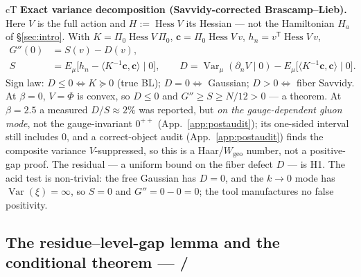 \begin{claimbox}{cT}
\smallskip
\textbf{Exact variance decomposition (Savvidy-corrected Brascamp--Lieb).} Here $V$ is the full
action and $H:=\operatorname{Hess}V$ its Hessian --- not the Hamiltonian $H_a$ of
\S\ref{sec:intro}. With
$K=\Pi_0\operatorname{Hess}V\,\Pi_0$, $\mathbf{c}=\Pi_0\operatorname{Hess}V\,v$,
$h_n=v^{\mathsf T}\operatorname{Hess}V\,v$,
\begin{equation}
\begin{aligned}
G''(0)&=S(v)-D(v),\\
S&=E_\mu\bigl[h_n-\langle K^{-1}\mathbf{c},\mathbf{c}\rangle\mid0\bigr],\qquad
D=\operatorname{Var}_\mu(\partial_nV\mid0)-E_\mu\bigl[\langle K^{-1}\mathbf{c},\mathbf{c}\rangle\mid0\bigr].
\end{aligned}
\label{eq:vardecomp}
\end{equation}
Sign law: $D\le0\iff K\succeq0$ (true BL); $D=0\iff$ Gaussian; $D>0\iff$ fiber Savvidy. At
$\beta=0$, $V=\Phi$ is convex, so $D\le0$ and $G''\ge S\ge N/12>0$ --- a theorem.
\LE{} At $\beta=2.5$ a measured $D/S\approx2\%$ was reported, but \emph{on the gauge-dependent
gluon mode}, not the gauge-invariant $0^{++}$ (App.~\ref{app:postaudit}); its one-sided interval
still includes $0$, and a correct-object audit (App.~\ref{app:postaudit}) finds the composite
variance $V$-suppressed, so this is a Haar/$W_{\mathrm{geo}}$ number, not a positive-gap proof.
The residual --- a uniform bound on the fiber defect $D$ --- is H1. The acid test is non-trivial: the free Gaussian has $D=0$, and the $k\to0$
mode has $\operatorname{Var}(\xi)=\infty$, so $S=0$ and $G''=0-0=0$; the tool manufactures no
false positivity.
\end{claimbox}

\subsection{The residue--level-gap lemma and the conditional theorem --- \LT{} / \LC}
\label{sec:reslevel}


